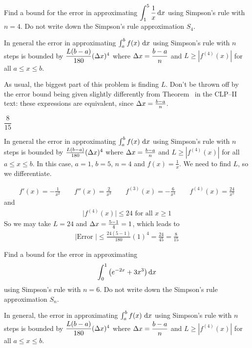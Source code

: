 \begin{question}[M105 2013A]
Find a bound for the error in approximating
$\displaystyle\int_1^5 \frac{1}{x}\,\mathrm{d}x$ using Simpson's rule with $n = 4$.
Do not write down the Simpson's rule approximation $S_4$.

In general the error in approximating
$\int_a^b f(x)\ \mathrm{d}x$ using Simpson's rule with $n$
steps is bounded by $\dfrac{L(b-a)}{180}(\Delta x)^4$ where $\Delta x=\dfrac{b-a}{n}$
and $L\ge |f^{(4)}(x)|$ for all $a\le x\le b$.
\end{question}

\begin{hint}
As usual, the biggest part of this problem is finding $L$. Don't be thrown off by the error bound being given slightly differently from Theorem~ in the CLP--II text: these expressions are equivalent, since $\Delta x = \frac{b-a}{n}$.
\end{hint}

\begin{answer}
$\dfrac{8}{15}$
\end{answer}

\begin{solution}
In general the error in approximating
$\int_a^b f(x)\ \mathrm{d}x$ using Simpson's rule with $n$
steps is bounded by $\frac{L(b-a)}{180}(\Delta x)^4$ where $\Delta x=\frac{b-a}{n}$
and $L\ge |f^{(4)}(x)|$ for all $a\le x\le b$. In this case, $a=1$, $b=5$,
$n=4$ and $f(x)=\frac{1}{x}$. We need to find $L$, so we differentiate.

\begin{align*}
f'(x)=-\frac{1}{x^2}\qquad
f''(x)=\frac{2}{x^3}\qquad
f^{(3)}(x)=-\frac{6}{x^4}\qquad
f^{(4)}(x)=\frac{24}{x^5}
\end{align*}
and
\begin{align*}
\big|f^{(4)}(x)\big|\le 24\text{ for all }x\ge 1
\end{align*}
So we may take $L=24$ and $\Delta x=\frac{5-1}{4}=1$, which leads to
\begin{align*}
|\text{Error }|\le \frac{24(5-1)}{180}(1)^4=\frac{24}{45}=\frac{8}{15}
\end{align*}
\end{solution}


\begin{Mquestion}[M105 2012A]
Find a bound for the error in approximating
\begin{equation*}
\int_0^1 \big(e^{-2x}+3x^3\big)\,\mathrm{d}x
\end{equation*}
using Simpson's rule with $n = 6$.
Do not write down the Simpson's rule approximation $S_n$.

In general, the error in approximating
$\int_a^b f(x)\ \mathrm{d}x$ using Simpson's rule with $n$
steps is bounded by $\dfrac{ L(b-a)}{180}(\Delta x)^4$ where $\Delta x=\dfrac{b-a}{n}$
and $L\ge |f^{(4)}(x)|$ for all $a\le x\le b$.
\end{Mquestion}


